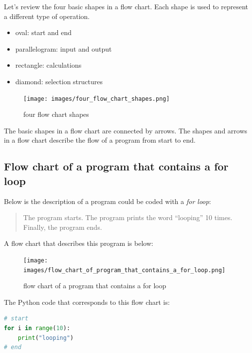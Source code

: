 \documentclass{book}
\providecommand{\tightlist}{%
      \setlength{\itemsep}{0pt}\setlength{\parskip}{0pt}}
\begin{document}
    
        Let's review the four basic shapes in a flow chart. Each shape is used
to represent a different type of operation.

\begin{itemize}
\tightlist
\item
  oval: start and end
\item
  parallelogram: input and output
\item
  rectangle: calculations
\item
  diamond: selection structures
\end{itemize}

\begin{figure}
\centering
\texttt{[image: images/four\_flow\_chart\_shapes.png]}
\caption{four flow chart shapes}
\end{figure}

The basic shapes in a flow chart are connected by arrows. The shapes and
arrows in a flow chart describe the flow of a program from start to end.
    




    
        \subsection{Flow chart of a program that contains a for
loop}\label{flow-chart-of-a-program-that-contains-a-for-loop}
    




    
        Below is the description of a program could be coded with a \emph{for
loop}:

\begin{quote}
The program starts. The program prints the word ``looping'' 10 times.
Finally, the program ends.
\end{quote}

A flow chart that describes this program is below:

\begin{figure}
\centering
\texttt{[image: images/flow\_chart\_of\_program\_that\_contains\_a\_for\_loop.png]}
\caption{flow chart of a program that contains a for loop}
\end{figure}

The Python code that corresponds to this flow chart is:

\begin{lstlisting}[language=Python]
# start
for i in range(10):
    print("looping")
# end
\end{lstlisting}
    
\end{document}
